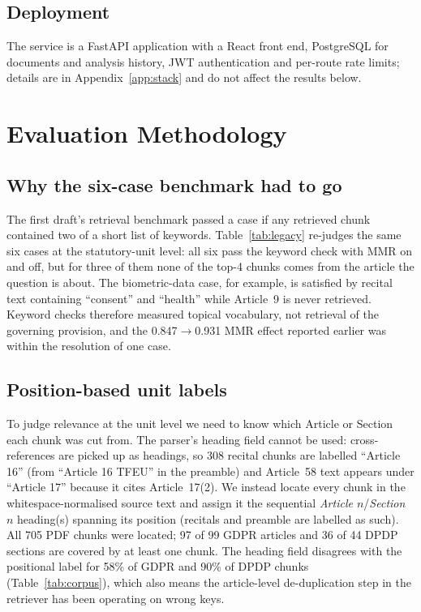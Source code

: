 \documentclass[conference]{IEEEtran}
\begin{document}
\subsection{Deployment}
The service is a FastAPI application with a React front end, PostgreSQL for documents and analysis history, JWT authentication and per-route rate limits; details are in Appendix~\ref{app:stack} and do not affect the results below.

\section{Evaluation Methodology}
\label{sec:benchmark}

\subsection{Why the six-case benchmark had to go}
The first draft's retrieval benchmark passed a case if any retrieved chunk contained two of a short list of keywords. Table~\ref{tab:legacy} re-judges the same six cases at the statutory-unit level: all six pass the keyword check with MMR on and off, but for three of them none of the top-4 chunks comes from the article the question is about. The biometric-data case, for example, is satisfied by recital text containing ``consent'' and ``health'' while Article~9 is never retrieved. Keyword checks therefore measured topical vocabulary, not retrieval of the governing provision, and the 0.847$\to$0.931 MMR effect reported earlier was within the resolution of one case.

\begin{table}[t]
\centering
\caption{The first draft's six cases: keyword check vs. unit-level judgment (production retriever, $k=4$).}
\label{tab:legacy}
\scriptsize
\setlength{\tabcolsep}{3pt}
\resizebox{\columnwidth}{!}{}
\end{table}

\subsection{Position-based unit labels}
To judge relevance at the unit level we need to know which Article or Section each chunk was cut from. The parser's heading field cannot be used: cross-references are picked up as headings, so 308 recital chunks are labelled ``Article 16'' (from ``Article 16 TFEU'' in the preamble) and Article~58 text appears under ``Article 17'' because it cites Article~17(2). We instead locate every chunk in the whitespace-normalised source text and assign it the sequential \emph{Article $n$}/\emph{Section $n$} heading(s) spanning its position (recitals and preamble are labelled as such). All 705 PDF chunks were located; 97 of 99 GDPR articles and 36 of 44 DPDP sections are covered by at least one chunk. The heading field disagrees with the positional label for 58\% of GDPR and 90\% of DPDP chunks (Table~\ref{tab:corpus}), which also means the article-level de-duplication step in the retriever has been operating on wrong keys.
\end{document}
